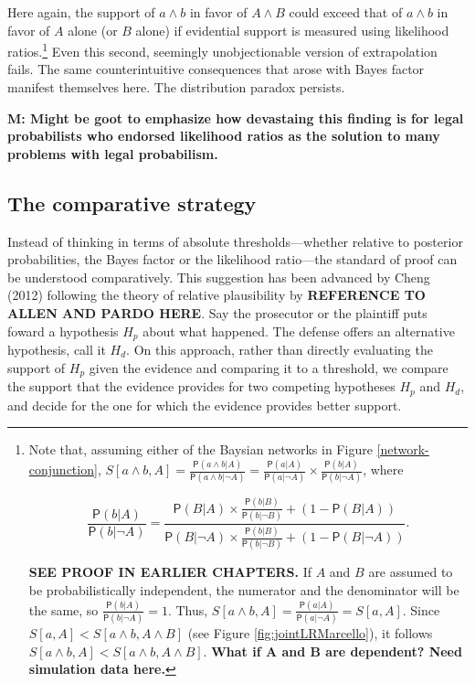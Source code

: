 \documentclass[10pt,dvipsnames,enabledeprecatedfontcommands]{scrartcl}
\newcommand{\pr}[1]{\mathsf{P}(#1)}
\begin{document}
\noindent
Here again, the support of \(a\wedge b\) in favor of \(A\wedge B\) could
exceed that of \(a\wedge b\) in favor of \(A\) alone (or \(B\) alone) if
evidential support is measured using likelihood
ratios.\footnote{Note that, assuming either of the Baysian networks 
in Figure \ref{network-conjunction},  $S[a\wedge b, A]=\frac{\pr{a \wedge b \vert A}}{\pr{a\wedge b\vert \neg A}}=\frac{\pr{a \vert A}}{\pr{a \vert \neg A}}\times \frac{\pr{b \vert A}}{\pr{b \vert \neg A}}$, where

\[\frac{\pr{b \vert A}}{\pr{b \vert \neg A}} = \frac{\pr{B \vert A} \times \frac{\pr{b \vert B}}{\pr{b \vert \neg B}} + (1- \pr{B \vert A})}{\pr{B \vert \neg A} \times \frac{\pr{b \vert B}}{\pr{b \vert \neg B}} + (1- \pr{B \vert \neg A})}.\]

\textbf{SEE PROOF IN EARLIER CHAPTERS.}
 If $A$ and $B$ are assumed to be probabilistically independent, the numerator and the denominator will be the same, 
 so $\frac{\pr{b \vert A}}{\pr{b \vert \neg A}}=1$. Thus, 
 $S[a\wedge b, A]=\frac{\pr{a \vert A}}{\pr{a \vert \neg A}}=S[a, A]$. Since $S[a, A]< S[a\wedge b, A\wedge B]$ (see Figure \ref{fig:jointLRMarcello}), it follows $S[a\wedge b, A]<S[a\wedge b, A\wedge B]$. \textbf{What if A and B are dependent? Need simulation data here.}}
Even this second, seemingly unobjectionable version of extrapolation
fails. The same counterintuitive consequences that arose with Bayes
factor manifest themselves here. The distribution paradox persists.


\textbf{M: Might be goot to emphasize how devastaing this finding is for legal probabilists 
who endorsed likelihood ratios as the solution to many problems with legal probabilism.}

\subsection{The comparative strategy}\label{the-comparative-strategy}

Instead of thinking in terms of absolute thresholds---whether relative
to posterior probabilities, the Bayes factor or the likelihood
ratio---the standard of proof can be understood comparatively. This
suggestion has been advanced by Cheng (2012) following the theory of
relative plausibility by \textbf{REFERENCE TO ALLEN AND PARDO HERE}. Say
the prosecutor or the plaintiff puts foward a hypothesis \(H_p\) about
what happened. The defense offers an alternative hypothesis, call it
\(H_d\). On this approach, rather than directly evaluating the support
of \(H_p\) given the evidence and comparing it to a threshold, we
compare the support that the evidence provides for two competing
hypotheses \(H_p\) and \(H_d\), and decide for the one for which the
evidence provides better support.
\end{document}

